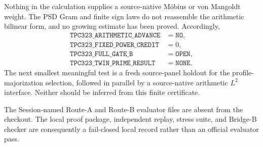\documentclass[10pt]{article}
\begin{document}
Nothing in the calculation supplies a source-native Möbius or von Mangoldt
weight.  The PSD Gram and finite sign laws do not reassemble the arithmetic
bilinear form, and no growing estimate has been proved.  Accordingly,
\[
\begin{array}{ll}
\texttt{TPC323\_ARITHMETIC\_ADVANCE} &= \texttt{NO},\\
\texttt{TPC323\_FIXED\_POWER\_CREDIT} &= 0,\\
\texttt{TPC323\_FULL\_GATE\_B} &= \texttt{OPEN},\\
\texttt{TPC323\_TWIN\_PRIME\_RESULT} &= \texttt{NONE}.
\end{array}
\]
The next smallest meaningful test is a fresh source-panel holdout for the
profile-majorization selection, followed in parallel by a source-native
arithmetic $L^2$ interface.  Neither should be inferred from this finite
certificate.

The Session-named Route-A and Route-B evaluator files are absent from the
checkout.  The local proof package, independent replay, stress suite, and
Bridge-B checker are consequently a fail-closed local record rather than an
official evaluator pass.
\end{document}

